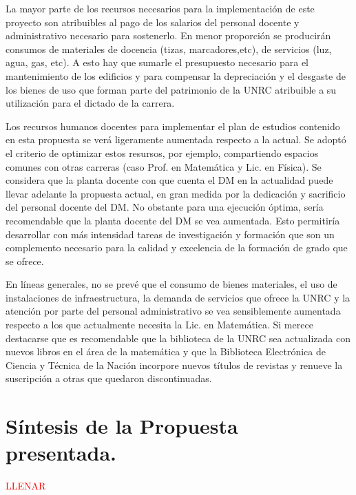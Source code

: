 \documentclass[a4paper, 12pt]{article}
\begin{document}
La mayor parte de los recursos necesarios para la implementación de este proyecto son atribuibles al pago de los salarios del personal docente y administrativo necesario para sostenerlo. En menor proporción se producirán  consumos de materiales de docencia (tizas, marcadores,etc), de servicios (luz, agua, gas, etc). A esto hay que sumarle el presupuesto necesario para el mantenimiento   de los edificios y para compensar la depreciación y el desgaste de los bienes de uso que forman parte del patrimonio de la UNRC atribuible a su utilización para el dictado de  la carrera. 

Los recursos humanos docentes para implementar el  plan de estudios contenido en esta propuesta  se verá ligeramente aumentada respecto a la actual. Se adoptó el criterio de optimizar estos resursos, por ejemplo, compartiendo espacios comunes con otras carreras (caso Prof. en Matemática y Lic. en Física).  Se considera que la planta docente con que cuenta el DM en la actualidad  puede llevar adelante la propuesta actual, en gran medida por la dedicación y sacrificio del personal docente del DM. No obstante para una ejecución óptima,  sería recomendable que la planta docente del DM se vea aumentada. Esto permitiría  desarrollar con más intensidad tareas de investigación y formación  que son un complemento necesario para la calidad y excelencia de la formación de grado que se ofrece. 

 En líneas generales, no se prevé que el consumo de bienes materiales, el uso de instalaciones de infraestructura, la demanda de servicios que ofrece la UNRC  y la atención por parte del personal administrativo  se vea sensiblemente aumentada respecto a los que actualmente necesita la Lic. en Matemática. Si merece destacarse que es recomendable que la biblioteca de la UNRC sea actualizada con nuevos libros en el área de la matemática y que la Biblioteca Electrónica de Ciencia y Técnica de 
la Nación incorpore nuevos títulos de revistas y renueve la suscripción a otras que quedaron discontinuadas. 


\section{Síntesis de la Propuesta presentada. }

\textcolor{red}{LLENAR}





\end{document}
